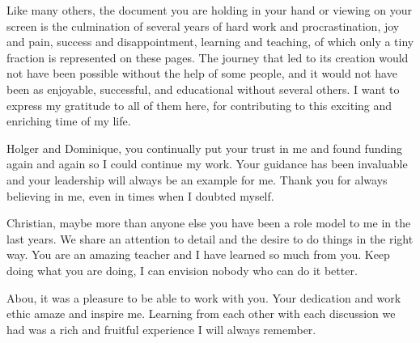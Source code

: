 %
Like many others, the document you are holding in your hand or viewing
on your screen is the culmination of several years of hard work and
procrastination, joy and pain, success and disappointment, learning and
teaching, of which only a tiny fraction is represented on these pages.
%
The journey that led to its creation would not have been possible without the
help of some people, and it would not have been as enjoyable, successful, and
educational without several others.
%
I want to express my gratitude to all of them here, for contributing to this
exciting and enriching time of my life.
%

%
Holger and Dominique, you continually put your trust in me and found funding
again and again so I could continue my work.
%
Your guidance has been invaluable and your leadership will always be an example
for me.
%
Thank you for always believing in me, even in times when I doubted myself.
%

%
Christian, maybe more than anyone else you have been a role model to me in the
last years.
%
We share an attention to detail and the desire to do things in the right way.
%
You are an amazing teacher and I have learned so much from you.
%
Keep doing what you are doing, I can envision nobody who can do it better.
%

%
Abou, it was a pleasure to be able to work with you.
%
Your dedication and work ethic amaze and inspire me.
%
Learning from each other with each discussion we had was a rich and fruitful
experience I will always remember.
%

%
%
%
%
%
%
%
%
%
%
%